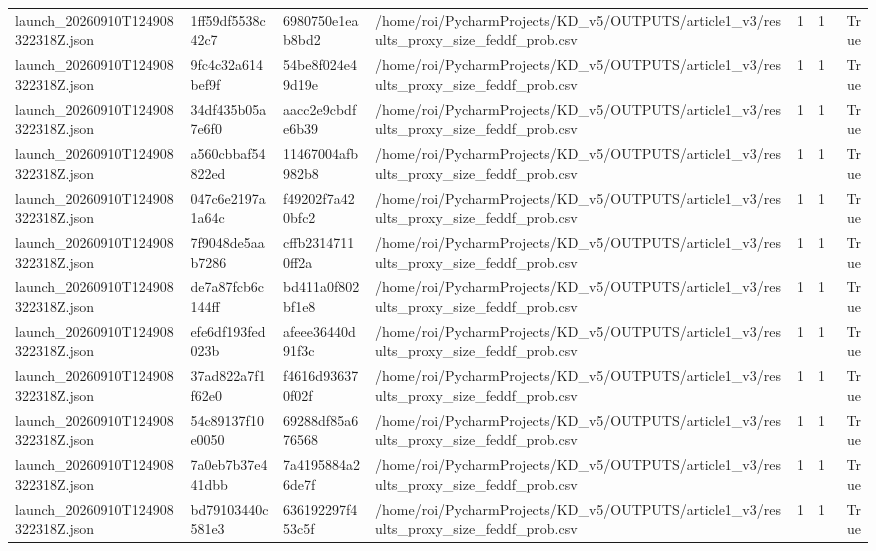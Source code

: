 \begin{tabular}{llllrrr}
launch\_20260910T124908322318Z.json & 1ff59df5538c42c7 & 6980750e1eab8bd2 & /home/roi/PycharmProjects/KD\_v5/OUTPUTS/article1\_v3/results\_proxy\_size\_feddf\_prob.csv & 1 & 1 & True \\
launch\_20260910T124908322318Z.json & 9fc4c32a614bef9f & 54be8f024e49d19e & /home/roi/PycharmProjects/KD\_v5/OUTPUTS/article1\_v3/results\_proxy\_size\_feddf\_prob.csv & 1 & 1 & True \\
launch\_20260910T124908322318Z.json & 34df435b05a7e6f0 & aacc2e9cbdfe6b39 & /home/roi/PycharmProjects/KD\_v5/OUTPUTS/article1\_v3/results\_proxy\_size\_feddf\_prob.csv & 1 & 1 & True \\
launch\_20260910T124908322318Z.json & a560cbbaf54822ed & 11467004afb982b8 & /home/roi/PycharmProjects/KD\_v5/OUTPUTS/article1\_v3/results\_proxy\_size\_feddf\_prob.csv & 1 & 1 & True \\
launch\_20260910T124908322318Z.json & 047c6e2197a1a64c & f49202f7a420bfc2 & /home/roi/PycharmProjects/KD\_v5/OUTPUTS/article1\_v3/results\_proxy\_size\_feddf\_prob.csv & 1 & 1 & True \\
launch\_20260910T124908322318Z.json & 7f9048de5aab7286 & cffb23147110ff2a & /home/roi/PycharmProjects/KD\_v5/OUTPUTS/article1\_v3/results\_proxy\_size\_feddf\_prob.csv & 1 & 1 & True \\
launch\_20260910T124908322318Z.json & de7a87fcb6c144ff & bd411a0f802bf1e8 & /home/roi/PycharmProjects/KD\_v5/OUTPUTS/article1\_v3/results\_proxy\_size\_feddf\_prob.csv & 1 & 1 & True \\
launch\_20260910T124908322318Z.json & efe6df193fed023b & afeee36440d91f3c & /home/roi/PycharmProjects/KD\_v5/OUTPUTS/article1\_v3/results\_proxy\_size\_feddf\_prob.csv & 1 & 1 & True \\
launch\_20260910T124908322318Z.json & 37ad822a7f1f62e0 & f4616d936370f02f & /home/roi/PycharmProjects/KD\_v5/OUTPUTS/article1\_v3/results\_proxy\_size\_feddf\_prob.csv & 1 & 1 & True \\
launch\_20260910T124908322318Z.json & 54c89137f10e0050 & 69288df85a676568 & /home/roi/PycharmProjects/KD\_v5/OUTPUTS/article1\_v3/results\_proxy\_size\_feddf\_prob.csv & 1 & 1 & True \\
launch\_20260910T124908322318Z.json & 7a0eb7b37e441dbb & 7a4195884a26de7f & /home/roi/PycharmProjects/KD\_v5/OUTPUTS/article1\_v3/results\_proxy\_size\_feddf\_prob.csv & 1 & 1 & True \\
launch\_20260910T124908322318Z.json & bd79103440c581e3 & 636192297f453c5f & /home/roi/PycharmProjects/KD\_v5/OUTPUTS/article1\_v3/results\_proxy\_size\_feddf\_prob.csv & 1 & 1 & True \\

\end{tabular}
